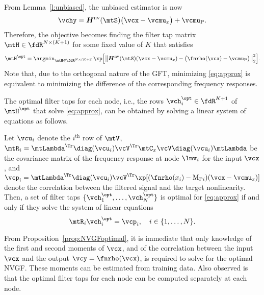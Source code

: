 From Lemma~\ref{l:unbiased}, the unbiased estimator is now
%
\begin{equation}
    \vchy = \mtfnH^{\text{nv}}(\mtS) \big( \vcx - \vcmu_{x} \big) + \vcmu_{\rho}.
\end{equation}
%
Therefore, the objective becomes finding the filter tap matrix $\mtH \in \fdR^{N \times (K+1)}$ for some fixed value of $K$ that satisfies
\begin{equation} \label{eq:approx}
    \mtH^{\opt} = \argmin_{\mtH \in \fdR^{N \times(K+1)}} \xp \Big[ \big\| \mtfnH^{\text{nv}}(\mtS) (\vcx-\vcmu_{x}) - \big(\fnrho(\vcx) - \vcmu_{\rho}\big) \big\|_{2}^{2} \Big].
\end{equation}
%
Note that, due to the orthogonal nature of the GFT, minimizing \eqref{eq:approx} is equivalent to minimizing the difference of the corresponding frequency responses.

The optimal filter taps for each node, i.e., the rows $\vch_{i}^{\opt} \in \fdR^{K+1}$ of $\mtH^{\opt}$ that solve \eqref{eq:approx}, can be obtained by solving a linear system of equations as follows.

\begin{proposition} \label{prop:NVGFoptimal}
Let $\vcu_{i}$ denote the $i^{\text{th}}$ row of $\mtV$,  $\mtR_{i} = \mtLambda^{\Tr} \diag(\vcu_{i}) \vcV^{\Tr} \mtC_{x} \vcV \diag(\vcu_{i}) \mtLambda$ be the covariance matrix of the frequency response at node $\lmv_{i}$ for the input $\vcx$, and $\vcp_{i} = \mtLambda^{\Tr} \diag(\vcu_{i}) \vcV^{\Tr} \xp[(\fnrho(x_{i}) - \mu_{\rho i})(\vcx-\vcmu_{x})]$ denote the correlation between the filtered signal and the target nonlinearity. Then, a set of filter taps $\{\vch_{1}^{\opt},\ldots,\vch_{N}^{\opt}\}$ is optimal for \eqref{eq:approx} if and only if they solve the system of linear equations
\begin{equation} \label{eq:NVGFoptimal}
    \mtR_{i} \vch_{i}^{\opt} = \vcp_{i}, \quad i\in\{1,\ldots,N\}.
\end{equation}
%
\end{proposition}

From Proposition~\ref{prop:NVGFoptimal}, it is immediate that only knowledge of the first and second moments of $\vcx$, and of the correlation between the input $\vcx$ and the output $\vcy = \fnrho(\vcx)$, is required to solve for the optimal NVGF. These moments can be estimated from training data. Also observed is that the optimal filter taps for each node can be computed separately at each node.

